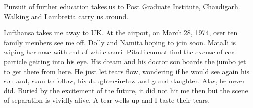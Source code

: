 Pursuit of further education takes us to Post Graduate Institute,
Chandigarh. Walking and Lambretta carry us around.

Lufthansa takes me away to UK. At the airport, on March 28, 1974, over ten
family members see me off. Dolly and Namita hoping to join soon. MataJi is
wiping her nose with end of while saari. PitaJi cannot find the excuse of
coal particle getting into his eye. His dream and his doctor son boards
the jumbo jet to get there from here. He just let tears flow, wondering if
he would see again his son and, soon to follow, his daughter-in-law and
grand daughter. Alas, he never did. Buried by the excitement of the
future, it did not hit me then but the scene of separation is vividly
alive. A tear wells up and I taste their tears.
